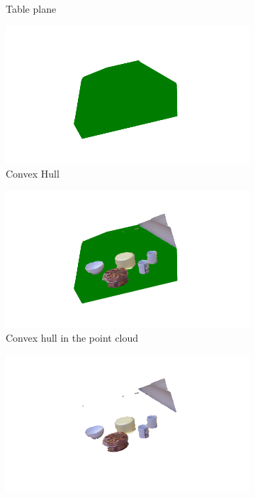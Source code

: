\begin{figure}[htp]
\begin{subfigure}[t]{0.32\textwidth}
\caption{Table plane}\label{img:obj_plane}
\end{subfigure}
\begin{subfigure}[t]{0.32\textwidth}
\includegraphics[width = 1.1\textwidth]{Img/ObjectSegmentation/convex_hull.png}
\caption{Convex Hull}\label{img:obj_conex_hull}
\end{subfigure}
\begin{subfigure}[t]{0.32\textwidth}
\includegraphics[width = 1.1\textwidth]{Img/ObjectSegmentation/convex_hull_full.png}
\caption{Convex hull in the point cloud}\label{img:obj_convex_hull_full}
\end{subfigure}
\begin{subfigure}[t]{0.32\textwidth}
\includegraphics[width = 1.1\textwidth]{Img/ObjectSegmentation/tabletop_objects.png}

\end{subfigure}
\end{figure}
